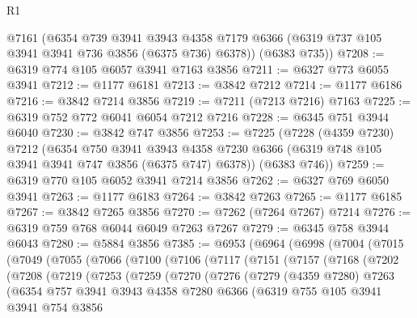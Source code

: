 \begin{lexlean}{R1}
\begin{coremodule}
      @7161
      (@6354
        @739
        @3941
        @3943
        @4358
        @7179
        @6366
        (@6319 @737 @105 @3941 @3941 @736 @3856 (@6375 @736) @6378))
      (@6383 @735))
@7208 := @6319 @774 @105 @6057 @3941 @7163 @3856
@7211 := @6327 @773 @6055 @3941
@7212 := @1177 @6181
@7213 := @3842 @7212
@7214 := @1177 @6186
@7216 := @3842 @7214 @3856
@7219 := @7211 (@7213 @7216) @7163
@7225 := @6319 @752 @772 @6041 @6054 @7212 @7216
@7228 := @6345 @751 @3944 @6040
@7230 := @3842 @747 @3856
@7253 := @7225
    (@7228
      (@4359 @7230)
      @7212
      (@6354
        @750
        @3941
        @3943
        @4358
        @7230
        @6366
        (@6319 @748 @105 @3941 @3941 @747 @3856 (@6375 @747) @6378))
      (@6383 @746))
@7259 := @6319 @770 @105 @6052 @3941 @7214 @3856
@7262 := @6327 @769 @6050 @3941
@7263 := @1177 @6183
@7264 := @3842 @7263
@7265 := @1177 @6185
@7267 := @3842 @7265 @3856
@7270 := @7262 (@7264 @7267) @7214
@7276 := @6319 @759 @768 @6044 @6049 @7263 @7267
@7279 := @6345 @758 @3944 @6043
@7280 := @5884 @3856
@7385 := @6953
    (@6964
      (@6998
        (@7004
          (@7015
            (@7049
              (@7055
                (@7066
                  (@7100
                    (@7106
                      (@7117
                        (@7151
                          (@7157
                            (@7168
                              (@7202
                                (@7208
                                  (@7219
                                    (@7253
                                      (@7259
                                        (@7270
                                          (@7276
                                            (@7279
                                              (@4359 @7280)
                                              @7263
                                              (@6354
                                                @757
                                                @3941
                                                @3943
                                                @4358
                                                @7280
                                                @6366
                                                (@6319
                                                  @755
                                                  @105
                                                  @3941
                                                  @3941
                                                  @754
                                                  @3856

\end{coremodule}
\end{lexlean}
